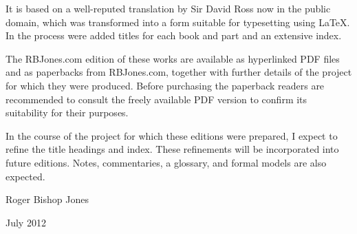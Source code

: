 It is based on a well-reputed translation by Sir David Ross now in the public domain, which was transformed into a form suitable for typesetting using {\LaTeX}.
In the process were added titles for each book and part and an extensive index.

The RBJones.com edition of these works are available as hyperlinked PDF files and as paperbacks from RBJones.com, together with further details of the project for which they were produced.
Before purchasing the paperback readers are recommended to consult the freely available PDF version to confirm its suitability for their purposes.

In the course of the project for which these editions were prepared, I expect to refine the title headings and index.
These refinements will be incorporated into future editions.
Notes, commentaries, a glossary, and formal models are also expected.

Roger Bishop Jones

July 2012

\mainmatter

\renewcommand{\aref}{\thechapter\ Part \arabic{section}}



\backmatter
%
%




\renewcommand{\aref}{}
\renewcommand{\bookname}{}
\renewcommand{\chaptermark}[1]{}
\renewcommand{\sectionmark}[1]{}

\printindex

\vfil



